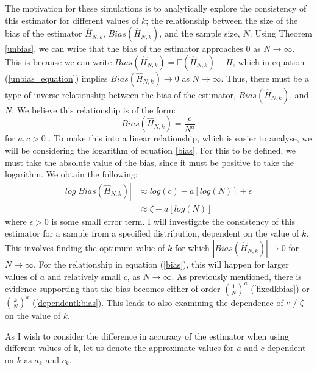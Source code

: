 \documentclass[12pt]{report}
\begin{document}
The motivation for these simulations is to analytically explore the consistency of this estimator for different values of $k$; the relationship between the size of the bias of the estimator $\hat{H}_{N, k}$, $Bias(\hat{H}_{N, k})$,  and the sample size, $N$. Using Theorem \ref{unbias}, we can write that the bias of the estimator approaches 0 as $N \to \infty$. This is because we can write $Bias(\hat{H}_{N, k} ) = \mathbb{E}(\hat{H}_{N, k}) - H$, which in equation (\ref{unbias_equation}) implies $Bias(\hat{H}_{N, k}) \to 0$ as $N \to \infty$. Thus, there must be a type of inverse relationship between the bias of the estimator, $Bias(\hat{H}_{N, k})$, and $N$. We believe this relationship is of the form:
\begin{equation} \label{bias}
Bias(\hat{H}_{N, k}) = \frac{c}{N^a}
\end{equation}
for $a, c > 0$ \cite{paper3, paper4}. To make this into a linear relationship, which is easier to analyse, we will be considering the logarithm of equation \ref{bias}. For this to be defined, we must take the absolute value of the bias, since it must be positive to take the logarithm. We obtain the following:
\begin{align} 
log|Bias(\hat{H}_{N, k})| &\approx log(c) - a [log(N)] + \epsilon \nonumber \\
&\approx \zeta - a [log(N)] \label{logbias}
\end{align}
where $\epsilon > 0$ is some small error term. I will investigate the consistency of this estimator for a sample from a specified distribution, dependent on the value of $k$. This involves finding the optimum value of $k$ for which $|Bias(\hat{H}_{N, k})| \to 0$ for $N \to \infty$. For the relationship in equation (\ref{bias}), this will happen for larger values of $a$ and relatively small $c$, as $N \to \infty$. As previously mentioned, there is evidence supporting that the bias becomes either of order $(\frac{1}{N})^a$ (\ref{fixedkbias}) or $(\frac{k}{N})^a$ (\ref{dependentkbias}). This leads to also examining the dependence of $c$ / $\zeta$ on the value of $k$. 

As I wish to consider the difference in accuracy of the estimator when using different values of k, let us denote the approximate values for $a$ and $c$ dependent on $k$ as $a_{k}$ and $c_{k}$.
\end{document}
